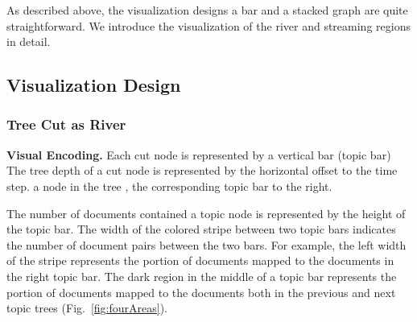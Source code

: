 As described above, the visualization designs  a bar and a stacked graph are quite straightforward.
We  introduce the visualization  of the river and streaming regions in detail.


\subsection{Visualization Design}
\subsubsection{Tree Cut as  River}

\noindent\textbf{\normalsize Visual Encoding.}
Each cut node is represented by a vertical bar (topic bar) 
The tree depth of a cut node is represented by the horizontal offset to the time step.
 a node in the tree , the corresponding topic bar  to the right.

The number of documents contained  a topic node is represented by the height of the topic bar.
The width of the colored stripe between two topic bars indicates the number of document pairs between the two bars.
For example, the left width of the stripe represents the portion of documents mapped to the documents in the right topic bar.
The dark region in the middle of a topic bar represents the portion of documents mapped to the documents both in the previous and  next topic trees (Fig.~\ref{fig:fourAreas}).



